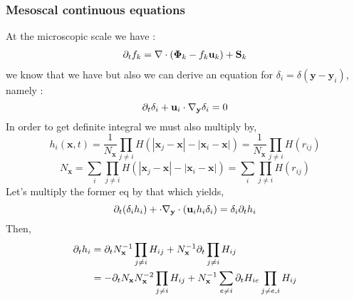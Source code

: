 \subsubsection{Mesoscal continuous equations}

At the microscopic scale we have : 
\begin{align}
    \partial_t f_k
    &= \mathbf{\nabla} \cdot (\mathbf{\Phi}_k - f_k \textbf{u}_k)
    + \textbf{S}_k
    \label{eq:dt_f_k}\\
\end{align}
we know that we have 
but also we can derive an equation for $\delta_i = \delta(\textbf{y}-\textbf{y}_i)$, namely : 
\begin{equation}
    \partial_t \delta_i
    + \textbf{u}_i \cdot \mathbf{\nabla}_\textbf{y}    \delta_i
    = 0 
\end{equation}
In order to get definite integral we must also multiply by,
\begin{equation*}
    h_{i}(\textbf{x},t) 
    = \frac{1}{N_\textbf{x}}
    \prod_{j \neq i}
    H(|\textbf{x}_j - \textbf{x}| - |\textbf{x}_i - \textbf{x}|)
    = \frac{1}{N_\textbf{x}}
    \prod_{j \neq i}
    H(r_{ij})
\end{equation*}
\begin{equation*}
    N_\textbf{x}
    = 
    \sum_{i}
    \prod_{j\neq i}
    H(|\textbf{x}_j - \textbf{x}| - |\textbf{x}_i - \textbf{x}|)
    = 
    \sum_{i}
    \prod_{j\neq i}
    H(r_{ij})
\end{equation*}
Let's multiply the former eq by that which yields, 
\begin{equation}
    \partial_t (\delta_ih_i)
    +  \cdot \mathbf{\nabla}_\textbf{y}  \cdot  (\textbf{u}_i h_i\delta_i)
    = \delta_i \partial_t h_i
\end{equation}
Then, 
\begin{align*}
    \partial_t h_i
    &= 
    \partial_t N_\textbf{x}^{-1} \prod_{j\neq i} H_{ij}
    + N_\textbf{x}^{-1} \partial_t \prod_{j\neq i} H_{ij}\\
    &= 
    - \partial_t N_\textbf{x} N_\textbf{x}^{-2} \prod_{j\neq i} H_{ij}
    + N_\textbf{x}^{-1} \sum_{e \neq i} \partial_t H_{ie} \prod_{j\neq e,i} H_{ij}
\end{align*}

